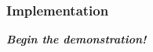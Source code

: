 \begin{frame}
	\frametitle{Implementation}
	\begin{block}{}
		\begin{center}
		\emph{\textbf{\Huge Begin the demonstration!}}
		\end{center}
	\end{block}
\end{frame}
